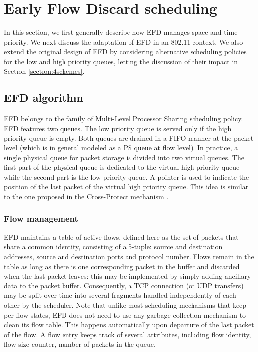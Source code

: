 \documentclass[preprint,12pt]{elsarticle}
\begin{document}
\section{Early Flow Discard scheduling}
\label{sec:efd_alg}

In this section, we first generally describe how EFD manages space and time priority. We next discuss the adaptation of EFD in an 802.11 context. We also extend the original design of EFD by considering alternative scheduling policies for the low and high priority queues, letting the discussion of their impact in Section \ref{section:4schemes}. 

\subsection{EFD algorithm}
EFD belongs to the family of Multi-Level Processor Sharing scheduling policy. EFD features two queues. The low priority queue is served only if the high priority queue is empty. Both queues are drained in a FIFO manner at the packet level (which is in general modeled as a PS queue at flow level). In practice, a single physical queue for packet storage is divided into two virtual queues. The first part of the physical queue is dedicated to the virtual high priority queue while the second part is the low priority queue. A pointer is used to indicate the position of the last packet of the virtual high priority queue. This idea is similar to the one proposed in the Cross-Protect mechanism \cite{Kortebi04Xprotect}. %

\subsubsection{Flow management}
EFD maintains a table of active flows, defined here as the set of packets that share a common identity, consisting of a 5-tuple: source and destination addresses, source and destination ports and protocol number. Flows remain in the table as long as there is one corresponding packet in the buffer and discarded when the last packet leaves: this may be implemented by simply adding ancillary data to the packet buffer. Consequently, a TCP connection (or UDP transfers) may be split over time into several fragments handled independently of each other by the scheduler. Note that unlike most scheduling mechanisms that keep per flow states, EFD does not need to use any garbage collection mechanism to clean its flow table. This happens automatically upon departure of the last packet of the flow. A flow entry keeps track of several attributes, including flow identity, flow size counter, number of packets in the queue. %
\end{document}
